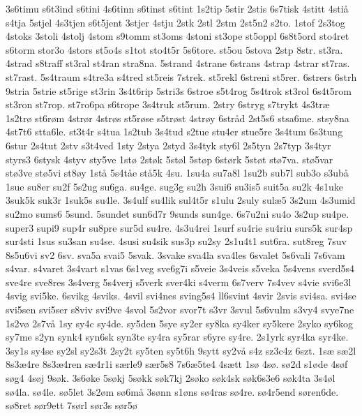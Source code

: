 {3s6timu
s6t3ind
s6tini
4s6tinn
s6tinst
s6tint
1s2tip
5stir
2stis
6s7tisk
4stitt
4sti^^e5
s4tja
5stjel
4s3tjen
s6t5jent
3stjer
4stju
2stk
2stl
2stm
2st5n2
s2to.
1stof
2s3tog
4stoks
3stoli
4stolj
4stom
s9tomm
st3oms
4stoni
st3ope
st5oppl
6s8t5ord
sto4ret
s6torm
stor3o
4stors
st5o4s
s1tot
sto4t5r
5s6tore.
st5ou
5stova
2stp
8str.
st3ra.
4strad
s8traff
st3ral
st4ran
stra8na.
5strand
4strane
6strans
4strap
4strar
st7ras.
st7rast.
5s4traum
s4tre3a
s4tred
st5reis
7strek.
st5rekl
6streni
st5rer.
6strers
6strh
9stria
5strie
st5rige
st3rin
3s4t6rip
5stri3s
6stroe
s5t4rog
5s4trok
st3rol
6s4t5rom
st3ron
st7rop.
st7ro6pa
s6trope
3s4truk
st5rum.
2stry
6stryg
s7trykt
4s3tr^^e6
1s2tr^^f8
st6r^^f8m
4str^^f8r
4str^^f8s
st5r^^f8se
s5tr^^f8st
4str^^f8y
6str^^e5d
2st5s6
stsa6me.
stsy8na
4st7t6
stta6le.
st3t4r
s4tua
1s2tub
3s4tud
s2tue
stu4er
stue5re
3s4tum
6s3tung
6stur
2s4tut
2stv
s3t4ved
1sty
2stya
2styd
3s4tyk
sty6l
2s5tyn
2s7typ
3s4tyr
styrs3
6stysk
4styv
sty5ve
1st^^f8
2st^^f8k
5st^^f8l
5st^^f8p
6st^^f8rk
5st^^f8t
st^^f87va.
st^^f85var
st^^f83ve
st^^f85vi
st8^^f8y
1st^^e5
5s4t^^e5e
st^^e55k
4su.
1su4a
su7a8l
1su2b
sub7l
sub3o
s3ub^^e5
1sue
su8er
su2f
5s2ug
su6ga.
su4ge.
sug3g
su2h
3sui6
su3is5
suit5a
su2k
4s1uke
3suk5k
suk3r
1suk5s
su4le.
3s4ulf
su4lik
sul4t5r
s1ulu
2suly
sul^^e65
3s2um
4s3umid
su2mo
sums6
5sund.
5sundet
sun6d7r
9sunds
sun4ge.
6s7u2ni
su4o
3s2up
su4pe.
super3
supi9
sup4r
su8pre
sur5d
su4re.
4s3u4rei
1surf
su4rie
su4riu
surs5k
sur4sp
sur4sti
1sus
su3san
su4se.
4susi
su4sik
sus3p
su2sy
2s1u4t1
sut6ra.
sut8reg
7suv
8s5u6vi
sv2
6sv.
sva5a
svai5
5svak.
3svake
sva4la
sva4les
6svalet
5s6vali
7s6vam
s4var.
s4varet
3s4vart
s1vas
6s1veg
sve6g7i
s5veie
3s4veis
s5veka
5s4vens
sverd5s4
sve4re
sve8res
3s4verg
5s4verj
s5verk
sver4ki
s4verm
6s7verv
7s4vev
s4vie
svi6e3l
4svig
svi5ke.
6svikg
4sviks.
4svil
svi4nes
sving5s4
ll6svint
4svir
2svis
svi4sa.
svi4se
svi5sen
svi5ser
s8viv
svi9ve
4svol
5s2vor
svor7t
s3vr
3svul
5s6vulm
s3vy4
svye7ne
1s2v^^f8
2s7v^^e5
1sy
sy4c
sy4de.
sy5den
5sye
sy2er
sy8ka
sy4ker
sy5kere
2syko
sy6kog
sy7me
s2yn
synk4
syn6sk
syn3te
sy4ra
sy5rar
s6yre
sy4re.
2s1yrk
syr4ka
syr4ke.
3sy1s
sy4se
sy2sl
sy2s3t
2sy2t
sy5ten
sy5t6h
9sytt
sy2v^^e5
s4z
sz3c4z
6szt.
1s^^e6
s^^e62l
8s3^^e64re
8s3^^e64ren
s^^e64r1i
s^^e6rle9
s^^e6r5s8
7s6^^e65te4
4s^^e6tt
1s^^f8
4s^^f8.
s^^f82d
s1^^f8de
4s^^f8f
s^^f8g4
4s^^f8j
9s^^f8k.
3s6^^f8ke
5s^^f8kj
5s^^f8kk
s^^f8k7kj
2s^^f8ko
s^^f8k4sk
s^^f8k6s3e6
s^^f8k4ta
3s4^^f8l
s^^f84la.
s^^f84le.
s^^f85let
3s2^^f8m
s^^f86m^^e5
3s^^f8nn
s1^^f8ns
s^^f84ras
s^^f84re.
s^^f84r5end
s^^f8ren6de.
s^^f88ret
s^^f8r9ett
7s^^f8rl
s^^f8r3s
s^^f8r5^^f8
}
